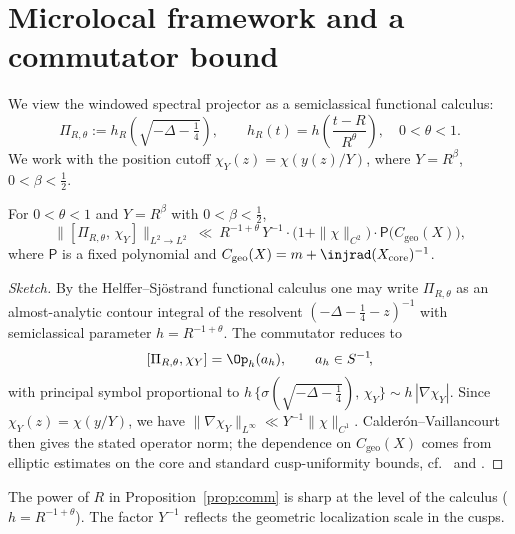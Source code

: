 \section{Microlocal framework and a commutator bound}\label{sec:microlocal}
We view the windowed spectral projector as a semiclassical functional calculus:
\[
\Pi_{R,\theta}:=h_R\!\left(\sqrt{-\Delta-\tfrac14}\right),
\qquad
h_R(t)=h\!\left(\frac{t-R}{R^\theta}\right),\quad 0<\theta<1 .
\]
We work with the position cutoff $\chi_Y(z)=\chi(y(z)/Y)$, where $Y=R^\beta$, $0<\beta<\tfrac12$.

\begin{proposition}\label{prop:comm}
For $0<\theta<1$ and $Y=R^\beta$ with $0<\beta<\tfrac12$,
\[
\bigl\|[\Pi_{R,\theta},\,\chi_Y]\bigr\|_{L^2\to L^2}
\ \ll\
R^{-1+\theta}\,Y^{-1}\cdot
\bigl(1+\|\chi\|_{C^2}\bigr)\cdot \mathsf{P}\!\bigl(C_{\mathrm{geo}}(X)\bigr),
\]
where $\mathsf{P}$ is a fixed polynomial and $C_{\mathrm{geo}}(X)=m+\injrad(X_{\mathrm{core}})^{-1}$.
\end{proposition}

\begin{proof}[Sketch]
By the Helffer--Sj\"ostrand functional calculus one may write $\Pi_{R,\theta}$ as an almost-analytic contour integral of the resolvent $( -\Delta-\tfrac14 -z)^{-1}$ with semiclassical parameter $h=R^{-1+\theta}$. The commutator reduces to
\[
[\Pi_{R,\theta},\chi_Y]=\Op_h(a_h),\qquad a_h\in S^{-1}\!,
\]
with principal symbol proportional to $h\,\{\sigma(\sqrt{-\Delta-\tfrac14}),\,\chi_Y\}\sim h\,|\nabla \chi_Y|$. Since $\chi_Y(z)=\chi(y/Y)$, we have $\|\nabla\chi_Y\|_{L^\infty}\ll Y^{-1}\|\chi\|_{C^1}$. Calder\'on--Vaillancourt then gives the stated operator norm; the dependence on $C_{\mathrm{geo}}(X)$ comes from elliptic estimates on the core and standard cusp-uniformity bounds, cf.\ \cite[Ch.~4]{zworski2012} and \cite[Prop.~6.4.4]{buser1992}.
\end{proof}

\begin{remark}
The power of $R$ in Proposition~\ref{prop:comm} is sharp at the level of the calculus ($h=R^{-1+\theta}$). The factor $Y^{-1}$ reflects the geometric localization scale in the cusps.
\end{remark}
